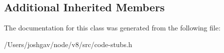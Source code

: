 \subsection*{Additional Inherited Members}


The documentation for this class was generated from the following file\+:\begin{DoxyCompactItemize}
\item 
/\+Users/joshgav/node/v8/src/code-\/stubs.\+h\end{DoxyCompactItemize}
